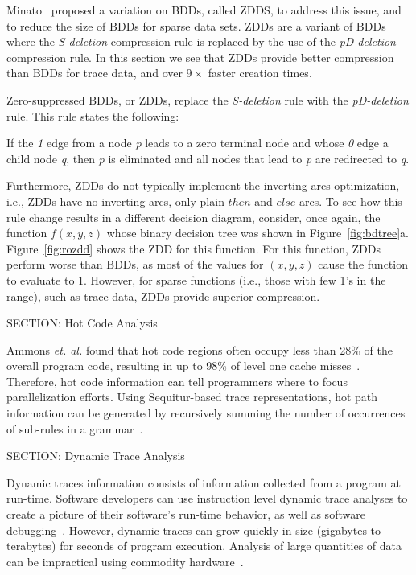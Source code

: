 {Minato~\cite{minato:93:dac} proposed a variation on BDDs, called ZDDS, to address this issue, and to reduce the size of BDDs for sparse data sets.  ZDDs are a variant of BDDs where the \textit{S-deletion} compression rule is replaced by the use of the \emph{pD-deletion} compression rule.  In this section we see that ZDDs provide better compression than BDDs for trace data, and over $9\times$ faster creation times.

Zero-suppressed BDDs, or ZDDs, replace the \textit{S-deletion} rule with the \textit{pD-deletion} rule.  This rule states the following: \begin{itemize}

 If the \textit{1} edge from a node \textit{p} leads to a zero
 terminal node and whose \textit{0} edge a child node \textit {q}, then \textit{p} is eliminated and all nodes that lead to \textit{p} are redirected to \textit{q}.

\end{itemize}

Furthermore, ZDDs do not typically implement the inverting arcs optimization, i.e., ZDDs have no inverting arcs, only plain $then$ and $else$ arcs.  To see how this rule change results in a different decision diagram, consider, once again, the function $f(x,y,z)$ whose binary decision tree was shown in Figure~\ref{fig:bdtree}a. Figure~\ref{fig:rozdd} shows the ZDD for this function. For this function, ZDDs perform worse than BDDs, as most of the values for $(x,y,z)$ cause the function to evaluate to 1.  However, for sparse functions (i.e., those with few 1's in the range), such as trace data, ZDDs provide superior compression.

SECTION: Hot Code Analysis


Ammons \textit{et. al.} found that hot code regions often occupy less than 28\% of the overall program code, resulting in up to 98\% of level one cache misses~\cite{ammons:97:sigplan}.  Therefore, hot code information can tell programmers where to focus parallelization efforts.  Using Sequitur-based trace representations, hot path information can be generated by recursively summing the number of occurrences of sub-rules in a grammar~\cite{larus:99:pldi}.

SECTION: Dynamic Trace Analysis


Dynamic traces information consists of information collected from a program at run-time.  Software developers can use instruction level dynamic trace analyses to create a picture of their software's run-time behavior, as well as software debugging~\cite{zhang:04:micro}.  However, dynamic traces can grow quickly in size (gigabytes to terabytes) for seconds of program execution. Analysis of large quantities of data can be impractical using commodity hardware~\cite{reiss:01:icse}.

}
